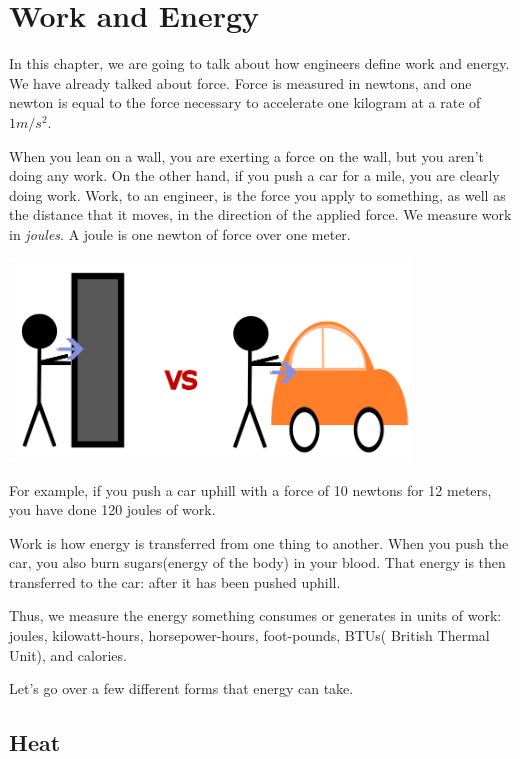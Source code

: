 \chapter{Work and Energy}

In this chapter, we are going to talk about how engineers define work
and energy.  We have already talked about force. Force is measured in
newtons, and one newton is equal to the force necessary to accelerate one
kilogram at a rate of $1 m/s^2$.

When you lean on a wall, you are exerting a force on the wall, but you
aren't doing any work. On the other hand, if you push a car for a mile,
you are clearly doing work. Work, to an engineer, is the force you
apply to something, as well as the distance that it moves, in the direction
of the applied force. We measure work in \textit{joules}. A joule is one
newton of force over one meter.

\includegraphics[width=0.8\textwidth]{Work_vs.png}

For example, if you push a car uphill with a force of 10 newtons for 12
meters, you have done 120 joules of work.

Work is how energy is transferred from one thing to another. When you
push the car, you also burn sugars(energy of the body) in your blood. That energy is then
transferred to the car: after it has been pushed uphill.

Thus, we measure the energy something consumes or generates in 
units of work: joules, kilowatt-hours, horsepower-hours, foot-pounds,
BTUs( British Thermal Unit), and calories.

Let's go over a few different forms that energy can take.
\section{Heat}

